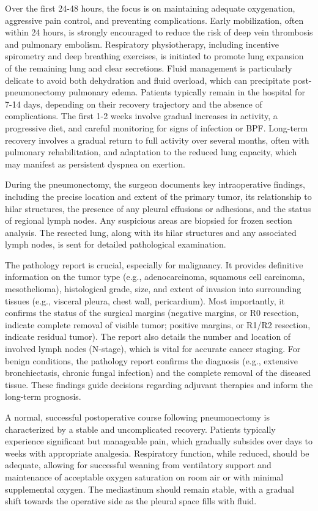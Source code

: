 Over the first 24-48 hours, the focus is on maintaining adequate oxygenation, aggressive pain control, and preventing complications. Early mobilization, often within 24 hours, is strongly encouraged to reduce the risk of deep vein thrombosis and pulmonary embolism. Respiratory physiotherapy, including incentive spirometry and deep breathing exercises, is initiated to promote lung expansion of the remaining lung and clear secretions. Fluid management is particularly delicate to avoid both dehydration and fluid overload, which can precipitate post-pneumonectomy pulmonary edema. Patients typically remain in the hospital for 7-14 days, depending on their recovery trajectory and the absence of complications. The first 1-2 weeks involve gradual increases in activity, a progressive diet, and careful monitoring for signs of infection or BPF. Long-term recovery involves a gradual return to full activity over several months, often with pulmonary rehabilitation, and adaptation to the reduced lung capacity, which may manifest as persistent dyspnea on exertion.

During the pneumonectomy, the surgeon documents key intraoperative findings, including the precise location and extent of the primary tumor, its relationship to hilar structures, the presence of any pleural effusions or adhesions, and the status of regional lymph nodes. Any suspicious areas are biopsied for frozen section analysis. The resected lung, along with its hilar structures and any associated lymph nodes, is sent for detailed pathological examination.

The pathology report is crucial, especially for malignancy. It provides definitive information on the tumor type (e.g., adenocarcinoma, squamous cell carcinoma, mesothelioma), histological grade, size, and extent of invasion into surrounding tissues (e.g., visceral pleura, chest wall, pericardium). Most importantly, it confirms the status of the surgical margins (negative margins, or R0 resection, indicate complete removal of visible tumor; positive margins, or R1/R2 resection, indicate residual tumor). The report also details the number and location of involved lymph nodes (N-stage), which is vital for accurate cancer staging. For benign conditions, the pathology report confirms the diagnosis (e.g., extensive bronchiectasis, chronic fungal infection) and the complete removal of the diseased tissue. These findings guide decisions regarding adjuvant therapies and inform the long-term prognosis.

A normal, successful postoperative course following pneumonectomy is characterized by a stable and uncomplicated recovery. Patients typically experience significant but manageable pain, which gradually subsides over days to weeks with appropriate analgesia. Respiratory function, while reduced, should be adequate, allowing for successful weaning from ventilatory support and maintenance of acceptable oxygen saturation on room air or with minimal supplemental oxygen. The mediastinum should remain stable, with a gradual shift towards the operative side as the pleural space fills with fluid.

